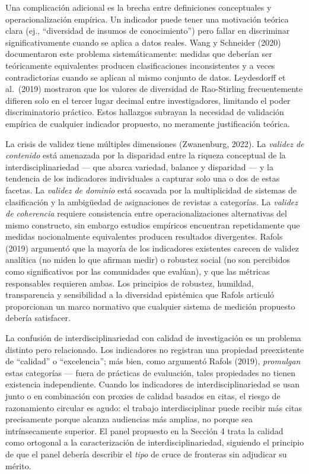 \documentclass[
]{article}
\begin{document}
Una complicación adicional es la brecha entre definiciones conceptuales
y operacionalización empírica. Un indicador puede tener una motivación
teórica clara (ej., ``diversidad de insumos de conocimiento'') pero
fallar en discriminar significativamente cuando se aplica a datos
reales. Wang y Schneider (2020) documentaron este problema
sistemáticamente: medidas que deberían ser teóricamente equivalentes
producen clasificaciones inconsistentes y a veces contradictorias cuando
se aplican al mismo conjunto de datos. Leydesdorff et al.~(2019)
mostraron que los valores de diversidad de Rao-Stirling frecuentemente
difieren solo en el tercer lugar decimal entre investigadores, limitando
el poder discriminatorio práctico. Estos hallazgos subrayan la necesidad
de validación empírica de cualquier indicador propuesto, no meramente
justificación teórica.

La crisis de validez tiene múltiples dimensiones (Zwanenburg, 2022). La
\emph{validez de contenido} está amenazada por la disparidad entre la
riqueza conceptual de la interdisciplinariedad --- que abarca variedad,
balance y disparidad --- y la tendencia de los indicadores individuales
a capturar solo una o dos de estas facetas. La \emph{validez de dominio}
está socavada por la multiplicidad de sistemas de clasificación y la
ambigüedad de asignaciones de revistas a categorías. La \emph{validez de
coherencia} requiere consistencia entre operacionalizaciones
alternativas del mismo constructo, sin embargo estudios empíricos
encuentran repetidamente que medidas nocionalmente equivalentes producen
resultados divergentes. Rafols (2019) argumentó que la mayoría de los
indicadores existentes carecen de validez analítica (no miden lo que
afirman medir) o robustez social (no son percibidos como significativos
por las comunidades que evalúan), y que las métricas responsables
requieren ambas. Los principios de robustez, humildad, transparencia y
sensibilidad a la diversidad epistémica que Rafols articuló proporcionan
un marco normativo que cualquier sistema de medición propuesto debería
satisfacer.

La confusión de interdisciplinariedad con calidad de investigación es un
problema distinto pero relacionado. Los indicadores no registran una
propiedad preexistente de ``calidad'' o ``excelencia''; más bien, como
argumentó Rafols (2019), \emph{promulgan} estas categorías --- fuera de
prácticas de evaluación, tales propiedades no tienen existencia
independiente. Cuando los indicadores de interdisciplinariedad se usan
junto o en combinación con proxies de calidad basados en citas, el
riesgo de razonamiento circular es agudo: el trabajo interdisciplinar
puede recibir más citas precisamente porque alcanza audiencias más
amplias, no porque sea intrínsecamente superior. El panel propuesto en
la Sección 4 trata la calidad como ortogonal a la caracterización de
interdisciplinariedad, siguiendo el principio de que el panel debería
describir el \emph{tipo} de cruce de fronteras sin adjudicar su mérito.
\end{document}
